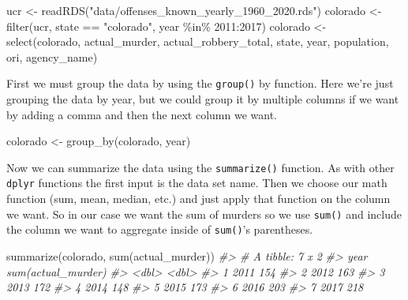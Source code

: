 \documentclass[
]{krantz}
\makeatletter
\newenvironment{Shaded}{\begin{snugshade}}{\end{snugshade}}
\newcommand{\CommentTok}[1]{\textcolor[rgb]{0.37,0.37,0.37}{\textit{#1}}}
\newcommand{\DecValTok}[1]{\textcolor[rgb]{0.06,0.06,0.06}{#1}}
\newcommand{\FunctionTok}[1]{\textcolor[rgb]{0,0,0}{#1}}
\newcommand{\NormalTok}[1]{#1}
\newcommand{\OtherTok}[1]{\textcolor[rgb]{0.37,0.37,0.37}{#1}}
\newcommand{\SpecialCharTok}[1]{\textcolor[rgb]{0,0,0}{#1}}
\newcommand{\StringTok}[1]{\textcolor[rgb]{0.5,0.5,0.5}{#1}}
\newenvironment{kframe}{%
\medskip{}
\setlength{\fboxsep}{.8em}
 \def\at@end@of@kframe{}%
 \ifinner\ifhmode%
  \def\at@end@of@kframe{\end{minipage}}%
  \begin{minipage}{\columnwidth}%
 \fi\fi%
 \def\FrameCommand##1{\hskip\@totalleftmargin \hskip-\fboxsep
 \colorbox{shadecolor}{##1}\hskip-\fboxsep
     \hskip-\linewidth \hskip-\@totalleftmargin \hskip\columnwidth}%
 \MakeFramed {\advance\hsize-\width
   \@totalleftmargin\z@ \linewidth\hsize
   \@setminipage}}%
 {\par\unskip\endMakeFramed%
 \at@end@of@kframe}
\renewenvironment{Shaded}{\begin{kframe}}{\end{kframe}}
\makeatother
\begin{document}
\begin{Shaded}
\begin{Highlighting}[]
\NormalTok{ucr }\OtherTok{\textless{}{-}} \FunctionTok{readRDS}\NormalTok{(}\StringTok{"data/offenses\_known\_yearly\_1960\_2020.rds"}\NormalTok{)}
\NormalTok{colorado }\OtherTok{\textless{}{-}} \FunctionTok{filter}\NormalTok{(ucr, state }\SpecialCharTok{==} \StringTok{"colorado"}\NormalTok{, }
\NormalTok{                   year }\SpecialCharTok{\%in\%} \DecValTok{2011}\SpecialCharTok{:}\DecValTok{2017}\NormalTok{)}
\NormalTok{colorado }\OtherTok{\textless{}{-}} \FunctionTok{select}\NormalTok{(colorado, actual\_murder, actual\_robbery\_total, state, year, population, ori, agency\_name)}
\end{Highlighting}
\end{Shaded}

First we must group the data by using the \texttt{group()} by function. Here we're just grouping the data by year, but we could group it by multiple columns if we want by adding a comma and then the next column we want.

\begin{Shaded}
\begin{Highlighting}[]
\NormalTok{colorado }\OtherTok{\textless{}{-}} \FunctionTok{group\_by}\NormalTok{(colorado, year)}
\end{Highlighting}
\end{Shaded}

Now we can summarize the data using the \texttt{summarize()} function. As with other \texttt{dplyr} functions the first input is the data set name. Then we choose our math function (sum, mean, median, etc.) and just apply that function on the column we want. So in our case we want the sum of murders so we use \texttt{sum()} and include the column we want to aggregate inside of \texttt{sum()}'s parentheses.

\begin{Shaded}
\begin{Highlighting}[]
\FunctionTok{summarize}\NormalTok{(colorado, }\FunctionTok{sum}\NormalTok{(actual\_murder))}
\CommentTok{\#\textgreater{} \# A tibble: 7 x 2}
\CommentTok{\#\textgreater{}    year \textasciigrave{}sum(actual\_murder)\textasciigrave{}}
\CommentTok{\#\textgreater{}   \textless{}dbl\textgreater{}                \textless{}dbl\textgreater{}}
\CommentTok{\#\textgreater{} 1  2011                  154}
\CommentTok{\#\textgreater{} 2  2012                  163}
\CommentTok{\#\textgreater{} 3  2013                  172}
\CommentTok{\#\textgreater{} 4  2014                  148}
\CommentTok{\#\textgreater{} 5  2015                  173}
\CommentTok{\#\textgreater{} 6  2016                  203}
\CommentTok{\#\textgreater{} 7  2017                  218}
\end{Highlighting}
\end{Shaded}
\end{document}
